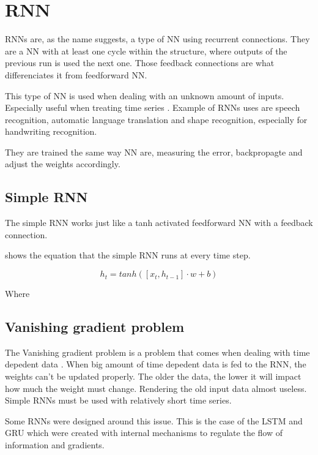 \section{\acs{RNN}}\label{sec:rnn}

\acp{RNN} are, as the name suggests, a type of \ac{NN} using recurrent connections. They are a \ac{NN} with at least one cycle within the structure, where outputs of the previous run is used the next one. Those feedback connections are what differenciates it from feedforward \ac{NN}.

This type of \ac{NN} is used when dealing with an unknown amount of inputs. Especially useful when treating time series \cite{rnn}. Example of \acp{RNN} uses are speech recognition, automatic language translation \cite{gru} and shape recognition, especially for handwriting recognition.

They are trained the same way \ac{NN} are, measuring the error, backpropagte and adjust the weights accordingly.

\subsection{Simple \ac{RNN}}

The simple \ac{RNN} works just like a \ac{tanh} activated feedforward \ac{NN} with a feedback connection.

 shows the equation that the simple \ac{RNN} runs at every time step.

\begin{equation}\label{eq:srnn}
h_t=tanh([x_t,h_{t-1}]\cdot w + b)
  \end{equation}

  Where

  \subsection{Vanishing gradient problem}

  The Vanishing gradient problem is a problem that comes when dealing with time depedent data \cite{vanishGrad}. When big amount of time depedent data is fed to the \ac{RNN}, the weights can't be updated properly. The older the data, the lower it will impact how much the weight must change. Rendering the old input data almost useless. Simple \acp{RNN} must be used with relatively short time series.

  Some \acp{RNN} were designed around this issue. This is the case of the \ac{LSTM} and \ac{GRU} which were created with internal mechanisms to regulate the flow of information and gradients.
